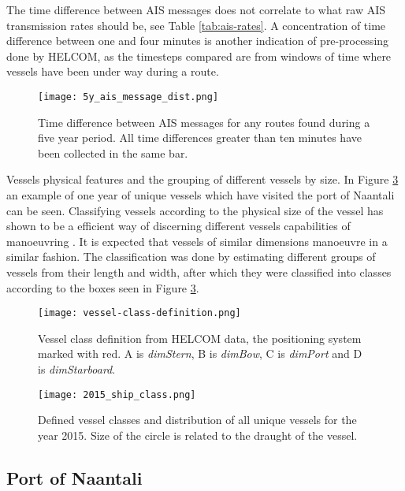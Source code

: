 \documentclass[../main.tex]{subfiles}
\begin{document}
The time difference between AIS messages does not correlate to what raw AIS transmission rates should be, see Table \ref{tab:ais-rates}. A concentration of time difference between one and four minutes is another indication of pre-processing done by HELCOM, as the timesteps compared are from windows of time where vessels have been under way during a route.

\begin{figure}[H]
	\centering
	\texttt{[image: 5y\_ais\_message\_dist.png]}
	\caption{Time difference between AIS messages for any routes found during a five year period. All time differences greater than ten minutes have been collected in the same bar.}
	\label{fig:ais-msg-dist}
\end{figure}


Vessels physical features and the grouping of different vessels by size. In Figure \ref{fig:vessel-classes} an example of one year of unique vessels which have visited the port of Naantali can be seen. Classifying vessels according to the physical size of the vessel has shown to be a efficient way of discerning different vessels capabilities of manoeuvring \cite{Jahn_2018}. It is expected that vessels of similar dimensions manoeuvre in a similar fashion. The classification was done by estimating different groups of vessels from their length and width, after which they were classified into classes according to the boxes seen in Figure \ref{fig:vessel-classes}.

\begin{figure}[H]
	\centering
	\texttt{[image: vessel-class-definition.png]}
	\caption{Vessel class definition from HELCOM data, the positioning system marked with red. A is \textit{dimStern}, B is \textit{dimBow}, C is \textit{dimPort} and D is \textit{dimStarboard}.}
	\label{fig:vessel-class-def}
\end{figure}

\begin{figure}[H]
	\centering
	\texttt{[image: 2015\_ship\_class.png]}
	\caption{Defined vessel classes and distribution of all unique vessels for the year 2015. Size of the circle is related to the draught of the vessel.}
	\label{fig:vessel-classes}
\end{figure}

\newpage
\subsection{Port of Naantali}
\end{document}
